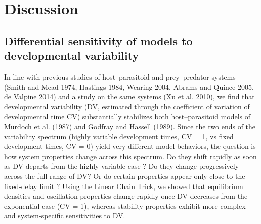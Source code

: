 \documentclass[12pt,a4paper,onecolumn]{article}
\begin{document}
\section{Discussion}
\subsection{Differential sensitivity of models to developmental variability}


\tabto{1.5 cm} In line with previous studies of host–parasitoid and prey–predator systems (Smith and Mead 1974, Hastings 1984, Wearing 2004, Abrams and Quince 2005, de Valpine 2014) and a study on the same systems (Xu et al. 2010), we find that developmental variability (DV, estimated through the coefficient of variation of developmental time CV) substantially stabilizes both host–parasitoid models of Murdoch et al. (1987) and Godfray and Hassell (1989). Since the two ends of the variability spectrum (highly variable development times, CV = 1, vs fixed development times, CV = 0) yield very different model behaviors, the question is how system properties change across this spectrum. Do they shift rapidly as soon as DV departs from the highly variable case ? Do they change progressively across the full range of DV? Or do certain properties appear only close to the fixed-delay limit ? Using the Linear Chain Trick, we showed that equilibrium densities and oscillation properties change rapidly once DV decreases from the exponential case (CV = 1), whereas stability properties exhibit more complex and system-specific sensitivities to DV.
\end{document}
